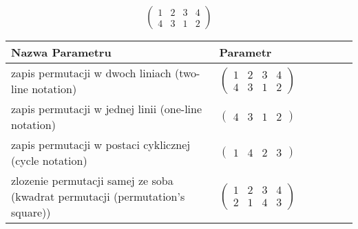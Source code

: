 \documentclass[12pt]{article}
\begin{document}
\subsection{}
\begin{center}
\[
\begin{pmatrix}
	1 & 2 & 3 & 4 \\ 
	4 & 3 & 1 & 2 
\end{pmatrix}
\]

\begin{tabular}{|m{0.6\linewidth}|m{0.4\linewidth}|}
	\hline
	Nazwa Parametru & Parametr \\
	\hline
	zapis permutacji w dwoch liniach (two-line notation) & $\begin{pmatrix} 1 & 2 & 3 & 4 \\ 
4 & 3 & 1 & 2 \end{pmatrix}$ \\ 
	\hline
	zapis permutacji w jednej linii (one-line notation) & $\begin{pmatrix} 4 & 3 & 1 & 2 \end{pmatrix}$ \\ 
	\hline
	zapis permutacji w postaci cyklicznej (cycle notation) & $\begin{pmatrix} 1 & 4 & 2 & 3 \end{pmatrix} $ \\ 
	\hline
	zlozenie permutacji samej ze soba (kwadrat permutacji (permutation's square)) & $\begin{pmatrix} 1 & 2 & 3 & 4 \\ 
2 & 1 & 4 & 3 \end{pmatrix}$ \\ 
	\hline
\end{tabular}
\end{center}
\end{document}

